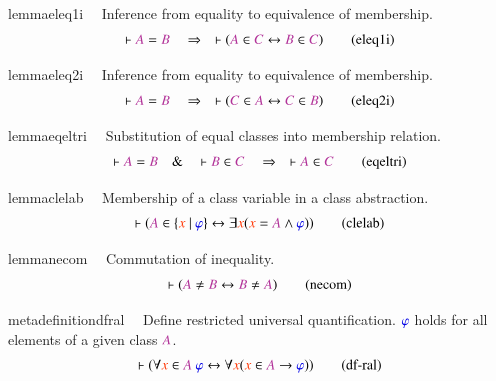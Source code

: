 \begin{restatable}{lemma}{eleq1i}~~ Inference from equality to equivalence of
membership.  ~
\begin{align}
\vdash \mc{A} = \mc{B}\quad\Rightarrow\quad \vdash ( \mc{A} \in \mc{C}
    \leftrightarrow \mc{B} \in \mc{C} )\label{eq:eleq1i}\tag{eleq1i}
\end{align}
\end{restatable}

\begin{restatable}{lemma}{eleq2i}~~ Inference from equality to equivalence of
membership.  ~
\begin{align}
\vdash \mc{A} = \mc{B}\quad\Rightarrow\quad \vdash ( \mc{C} \in \mc{A}
    \leftrightarrow \mc{C} \in \mc{B} )\label{eq:eleq2i}\tag{eleq2i}
\end{align}
\end{restatable}

\begin{restatable}{lemma}{eqeltri}~~ Substitution of equal classes into
membership relation.  ~
\begin{align}
\vdash \mc{A} = \mc{B}\quad\&\quad \vdash \mc{B} \in
    \mc{C}\quad\Rightarrow\quad \vdash \mc{A} \in
    \mc{C}\label{eq:eqeltri}\tag{eqeltri}
\end{align}
\end{restatable}

\begin{restatable}{lemma}{clelab}~~ Membership of a class variable in a class
abstraction.  ~  ~
\begin{align}
\vdash ( \mc{A} \in \{ \msc{x}~\vert~\mw{\varphi} \} \leftrightarrow \exists
    \msc{x} ( \msc{x} = \mc{A} \wedge \mw{\varphi} )
    )\label{eq:clelab}\tag{clelab}
\end{align}
\end{restatable}

\begin{restatable}{lemma}{necom}~~ Commutation of inequality.  ~
\begin{align}
\vdash ( \mc{A} \ne \mc{B} \leftrightarrow \mc{B} \ne \mc{A}
    )\label{eq:necom}\tag{necom}
\end{align}
\end{restatable}

\begin{restatable}{metadefinition}{dfral}~~ Define restricted universal
quantification.    $\mw{\varphi}$ holds for  all elements of a given class $\mc{A}$.  
\begin{align}
\vdash ( \forall \msc{x} \in \mc{A}~\mw{\varphi} \leftrightarrow \forall
    \msc{x} ( \msc{x} \in \mc{A} \rightarrow \mw{\varphi} )
    )\label{eq:df-ral}\tag{df-ral}
\end{align}
\end{restatable}

